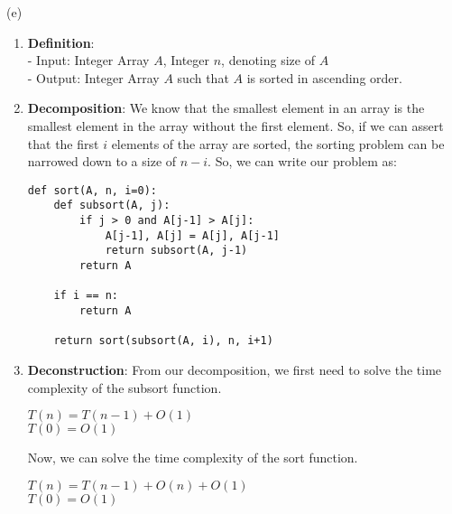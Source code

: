 \documentclass[a4paper]{article}
\begin{document}
\begin{enumerate}
(e)
\begin{enumerate}[label=\roman*]
    \item \textbf{Definition}:\\
    - Input: Integer Array $A$, Integer $n$, denoting size of $A$\\
    - Output: Integer Array $A$ such that $A$ is sorted in ascending order.

    \item \textbf{Decomposition}: We know that the smallest element in an array is the smallest element in the array without the first element. So, if we can assert that the first $i$ elements of the array are sorted, the sorting problem can be narrowed down to a size of $n-i$. So, we can write our problem as:

\begin{verbatim}
def sort(A, n, i=0):
    def subsort(A, j):
        if j > 0 and A[j-1] > A[j]:
            A[j-1], A[j] = A[j], A[j-1]
            return subsort(A, j-1)
        return A
    
    if i == n:
        return A
    
    return sort(subsort(A, i), n, i+1)
\end{verbatim}

\item \textbf{Deconstruction}: From our decomposition, we first need to solve the time complexity of the subsort function.\\
\begin{center}
    $T(n) = T(n-1) + O(1)$\\
    $T(0) = O(1)$
\end{center}

Now, we can solve the time complexity of the sort function.\\
\begin{center}
    $T(n) = T(n-1) + O(n) + O(1)$\\
    $T(0) = O(1)$
\end{center}



\end{enumerate}
\end{enumerate}
\end{document}
